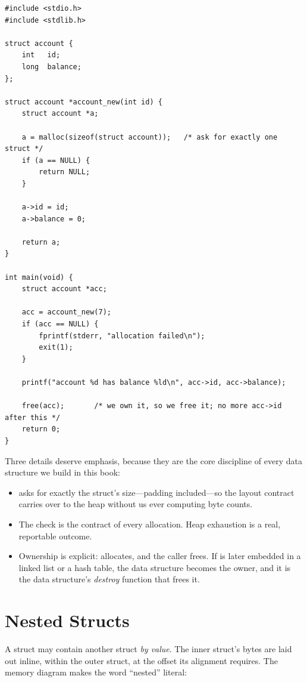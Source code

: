 \begin{lstlisting}[caption={A struct living on the heap, with ownership handled.}]
#include <stdio.h>
#include <stdlib.h>

struct account {
    int   id;
    long  balance;
};

struct account *account_new(int id) {
    struct account *a;

    a = malloc(sizeof(struct account));   /* ask for exactly one struct */
    if (a == NULL) {
        return NULL;
    }

    a->id = id;
    a->balance = 0;

    return a;
}

int main(void) {
    struct account *acc;

    acc = account_new(7);
    if (acc == NULL) {
        fprintf(stderr, "allocation failed\n");
        exit(1);
    }

    printf("account %d has balance %ld\n", acc->id, acc->balance);

    free(acc);       /* we own it, so we free it; no more acc->id after this */
    return 0;
}
\end{lstlisting}

Three details deserve emphasis, because they are the core discipline of
every data structure we build in this book:

\begin{itemize}
  \item {} asks for exactly the
    struct's size---padding included---so the layout contract carries
    over to the heap without us ever computing byte counts.
  \item The  check is the contract of every
    allocation. Heap exhaustion is a real, reportable outcome.
  \item Ownership is explicit:  allocates, and the
    caller frees. If  is later embedded in a linked list or a
    hash table, the data structure becomes the owner, and it is the
    data structure's \emph{destroy} function that frees it.
\end{itemize}

\section{Nested Structs}

A struct may contain another struct \emph{by value}. The inner struct's
bytes are laid out inline, within the outer struct, at the offset its
alignment requires. The memory diagram makes the word ``nested'' literal:

